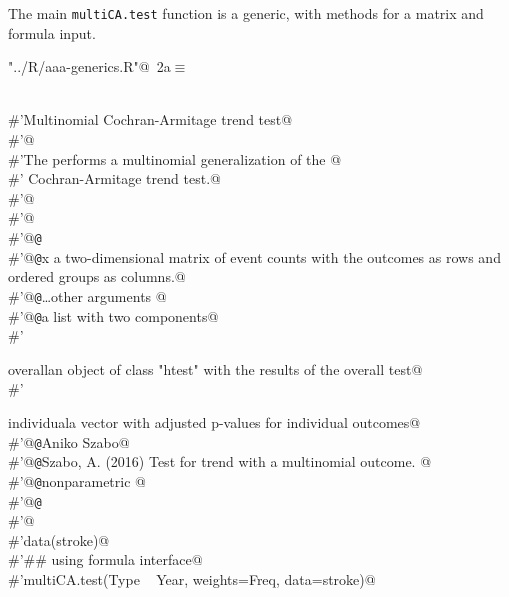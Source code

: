 \documentclass[reqno]{amsart}
\renewcommand{\NWtarget}[2]{\hypertarget{#1}{#2}}
\begin{document}
The main \texttt{multiCA.test} function is a generic, with methods for a matrix and formula input.

\begin{flushleft} \small
\begin{minipage}{\linewidth}\label{scrap1}\raggedright\small
\NWtarget{nuweb2a}{} \verb@"../R/aaa-generics.R"@\nobreak\ {\footnotesize {2a}}$\equiv$
\vspace{-1ex}
\begin{list}{}{} \item
\mbox{}\verb@@\\
\mbox{}\verb@#'Multinomial Cochran-Armitage trend test@\\
\mbox{}\verb@#'@\\
\mbox{}\verb@#'The  performs a multinomial generalization of the @\\
\mbox{}\verb@#' Cochran-Armitage trend test.@\\
\mbox{}\verb@#'@\\
\mbox{}\verb@#'@\\
\mbox{}\verb@#'@{\tt @}\verb@export@\\
\mbox{}\verb@#'@{\tt @}\verb@param x a two-dimensional matrix of event counts with the outcomes as rows and ordered groups as columns.@\\
\mbox{}\verb@#'@{\tt @}\verb@param \dots other arguments @\\
\mbox{}\verb@#'@{\tt @}\verb@return a list with two components@\\
\mbox{}\verb@#' \item{overall}{an object of class "htest" with the results of the overall test}@\\
\mbox{}\verb@#' \item{individual}{a vector with adjusted p-values for individual outcomes}@\\
\mbox{}\verb@#'@{\tt @}\verb@author Aniko Szabo@\\
\mbox{}\verb@#'@{\tt @}\verb@references Szabo, A. (2016) Test for trend with a multinomial outcome.  @\\
\mbox{}\verb@#'@{\tt @}\verb@keywords nonparametric @\\
\mbox{}\verb@#'@{\tt @}\verb@examples@\\
\mbox{}\verb@#'@\\
\mbox{}\verb@#'data(stroke)@\\
\mbox{}\verb@#'## using formula interface@\\
\mbox{}\verb@#'multiCA.test(Type ~ Year, weights=Freq, data=stroke)@\\

\end{list}
\end{minipage}
\end{flushleft}
\end{document}
